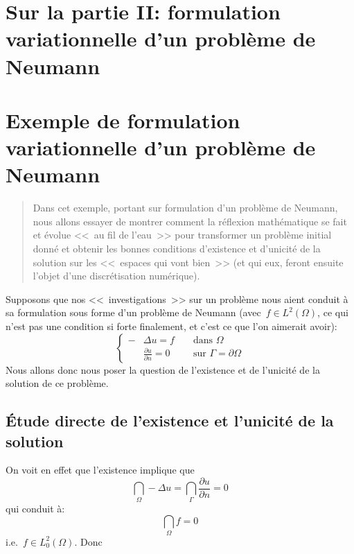 \ifVersionAvecExemplesSepares
  \chapter{Sur la partie II: formulation variationnelle d'un problème de Neumann}
\else
  \chapter{Exemple de formulation variationnelle d'un problème de Neumann}
\fi
\begin{abstract}
Dans cet exemple, portant sur formulation d'un problème de Neumann,
nous allons essayer de montrer comment la réflexion mathématique se
fait et évolue <<~au fil de l'eau~>> pour transformer un problème initial donné et obtenir
les bonnes conditions d'existence et d'unicité de la solution sur les <<~espaces qui vont
bien~>> (et qui eux, feront ensuite l'objet d'une discrétisation numérique).
\end{abstract}

Supposons que nos <<~investigations~>> sur un problème nous aient
conduit à sa formulation sous forme d'un problème de Neumann
(avec~$f\in L^2(\Omega)$, ce qui n'est pas une condition si forte finalement, et c'est ce que l'on aimerait avoir):
\begin{equation}\left\{
\begin{aligned}
-&\Delta u = f && \text{ dans } \Omega\\
&\frac{\partial u}{\partial n}=0 && \text{ sur }\Gamma=\partial\Omega
\end{aligned}
\right.
\end{equation}
Nous allons donc nous poser la question de l'existence et de l'unicité de la solution de ce problème.

\medskip
\section{Étude directe de l'existence et l'unicité de la solution}

On voit en effet que l'existence implique que
\begin{equation}\dint_\Omega -\Delta u = \dint_\Gamma \frac{\partial u}{\partial n}=0\end{equation}
qui conduit à:\begin{equation}\dint_\Omega f =0\end{equation} i.e.~$f\in L^2_0(\Omega)$.
Donc 

